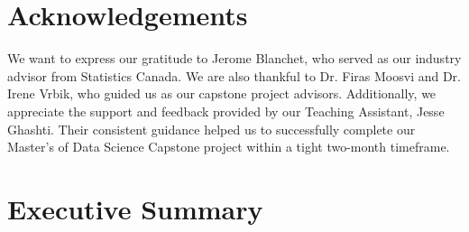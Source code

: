 \documentclass[11pt, a4paper]{article}
\begin{document}
\pagebreak



\thispagestyle{empty}
\setcounter{tocdepth}{2} %
{
  \hypersetup{linkcolor=black}
  \tableofcontents
}
\thispagestyle{empty}

\pagebreak
\thispagestyle{empty}
{
  \hypersetup{linkcolor=black}
  \small
  \listoffigures
}
\thispagestyle{empty}

\vspace{2pc}

\pagebreak
\thispagestyle{empty}
{
  \hypersetup{linkcolor=black}
  \listoftables
}
\pagebreak



\thispagestyle{empty}
\section*{Acknowledgements}

We want to express our gratitude to Jerome Blanchet, who served as our industry advisor from Statistics Canada. We are also thankful to Dr. Firas Moosvi and Dr. Irene Vrbik, who guided us as our capstone project advisors. Additionally, we appreciate the support and feedback provided by our Teaching Assistant, Jesse Ghashti. Their consistent guidance helped us to successfully complete our Master's of Data Science Capstone project within a tight two-month timeframe.







\pagebreak
\section{Executive Summary}
\par

\fancyhf{}
\setcounter{page}{1}
\lhead{\thepage}
\end{document}
